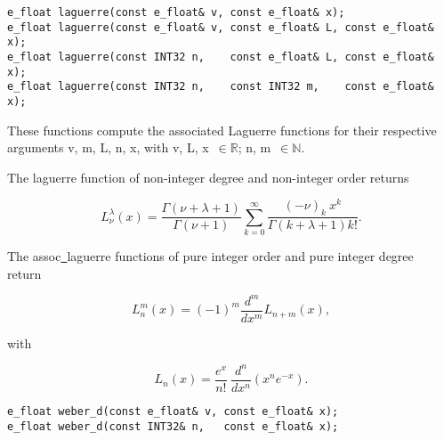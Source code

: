 \begin{lstlisting}
e_float laguerre(const e_float& v, const e_float& x);
e_float laguerre(const e_float& v, const e_float& L, const e_float& x);
e_float laguerre(const INT32 n,    const e_float& L, const e_float& x);
e_float laguerre(const INT32 n,    const INT32 m,    const e_float& x);
\end{lstlisting}

\vspace{6.0pt}

 These functions compute the associated Laguerre functions for
their respective arguments
{\courier v}, {\courier m}, {\courier L}, {\courier n}, {\courier x},
with {\courier v}, {\courier L}, {\courier x}~$\in\mathbb{R}$;
{\courier n}, {\courier m}~$\in\mathbb{N}$.

\vspace{6.0pt}

 The {\courier laguerre} function
of non-integer degree and non-integer order
returns~\cite{wolframfunctions:website}

\begin{equation}
L_{\nu}^{\lambda}(x) = \frac{\Gamma(\nu + \lambda + 1)}{\Gamma(\nu + 1)}
\sum_{k=0}^{\infty}
\frac{(-\nu)_{k}\ x^{k}}{\Gamma(k + \lambda + 1) k!}.
\end{equation}

\vspace{6.0pt}

 The {\courier assoc\underline\ laguerre} functions
of pure integer order and pure integer degree
return~\cite{wolframmathworld:website}

\begin{equation}
L_{n}^{m}(x) = (-1)^m \frac{d^{m}}{dx^{m}} L_{n+m}(x),
\end{equation}

\noindent with

\begin{equation}
L_{n}(x) = \frac{e^{x}}{n!}\ \frac{d^{n}}{dx^{n}}(x^{n} e^{-x}).
\end{equation}

\begin{lstlisting}
e_float weber_d(const e_float& v, const e_float& x);
e_float weber_d(const INT32& n,   const e_float& x);
\end{lstlisting}

\vspace{6.0pt}

